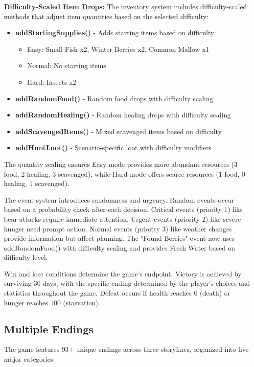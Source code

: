\documentclass[12pt,a4paper]{article}
\begin{document}
\textbf{Difficulty-Scaled Item Drops:} The inventory system includes difficulty-scaled methods that adjust item quantities based on the selected difficulty:
\begin{itemize}
	\item \textbf{addStartingSupplies()} - Adds starting items based on difficulty:
	      \begin{itemize}
		      \item Easy: Small Fish x2, Winter Berries x2, Common Mallow x1
		      \item Normal: No starting items
		      \item Hard: Insects x2
	      \end{itemize}
	\item \textbf{addRandomFood()} - Random food drops with difficulty scaling
	\item \textbf{addRandomHealing()} - Random healing drops with difficulty scaling
	\item \textbf{addScavengedItems()} - Mixed scavenged items based on difficulty
	\item \textbf{addHuntLoot()} - Scenario-specific loot with difficulty modifiers
\end{itemize}

The quantity scaling ensures Easy mode provides more abundant resources (3 food, 2 healing, 3 scavenged), while Hard mode offers scarce resources (1 food, 0 healing, 1 scavenged).

The event system introduces randomness and urgency. Random events occur based on a probability check after each decision. Critical events (priority 1) like bear attacks require immediate attention. Urgent events (priority 2) like severe hunger need prompt action. Normal events (priority 3) like weather changes provide information but affect planning. The "Found Berries" event now uses addRandomFood() with difficulty scaling and provides Fresh Water based on difficulty level.

Win and lose conditions determine the game's endpoint. Victory is achieved by surviving 30 days, with the specific ending determined by the player's choices and statistics throughout the game. Defeat occurs if health reaches 0 (death) or hunger reaches 100 (starvation).

\subsection{Multiple Endings}
The game features 93+ unique endings across three storylines, organized into five major categories:
\end{document}
